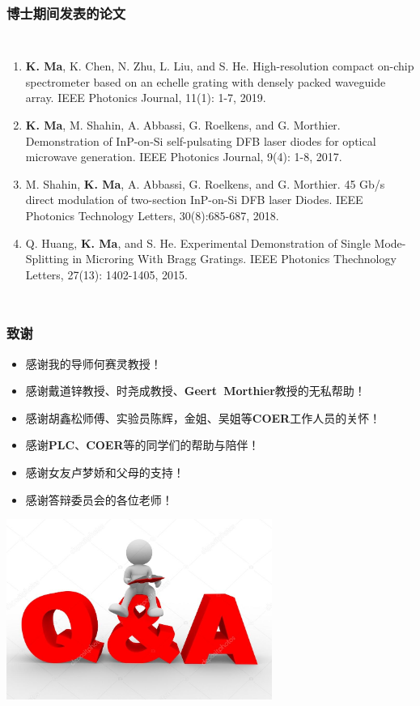 \documentclass{beamer}
\begin{document}
\begin{frame}
\frametitle{博士期间发表的论文}
\begin{columns}
	\column{\dimexpr\paperwidth-20pt}
	\begin{enumerate}
		\item \textbf{K. Ma}, K. Chen, N. Zhu, L. Liu, and S. He. High-resolution compact on-chip spectrometer based on an echelle grating with densely packed waveguide array. IEEE Photonics Journal, 11(1): 1-7, 2019.
		\item \textbf{K. Ma}, M. Shahin, A. Abbassi, G. Roelkens, and G. Morthier. Demonstration of InP-on-Si self-pulsating DFB laser diodes for optical microwave generation. IEEE Photonics Journal, 9(4): 1-8, 2017.
		\item M. Shahin, \textbf{K. Ma}, A. Abbassi, G. Roelkens, and G. Morthier. 45 Gb/s direct modulation of two-section InP-on-Si DFB laser Diodes. IEEE Photonics Technology Letters, 30(8):685-687, 2018.
		\item Q. Huang, \textbf{K. Ma}, and S. He. Experimental Demonstration of Single Mode-Splitting in Microring With Bragg Gratings. IEEE Photonics Thechnology Letters, 27(13): 1402-1405, 2015.
	\end{enumerate}
\end{columns}

\end{frame}

\begin{frame}
\frametitle{致谢}
\begin{itemize}
	\item 感谢我的导师何赛灵教授！
	\item 感谢戴道锌教授、时尧成教授、\mbox{\bfseries Geert Morthier}教授的无私帮助！
	\item 感谢胡鑫松师傅、实验员陈辉，金姐、吴姐等\mbox{\bfseries COER}工作人员的关怀！
	\item 感谢\mbox{\bfseries PLC}、\mbox{\bfseries COER}等的同学们的帮助与陪伴！
	\item 感谢女友卢梦娇和父母的支持！
	\item 感谢答辩委员会的各位老师！
\end{itemize}
\end{frame}

\begin{frame}
	\centering
	\includegraphics[width=0.65\textwidth]{./Pictures/questionandanswer.jpg}
\end{frame}
\end{document}
